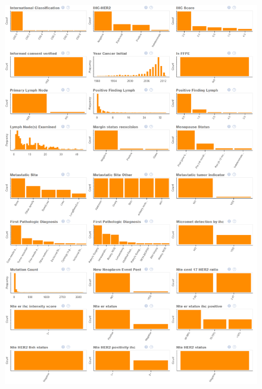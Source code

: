 \begin{figure}
	\centering
	\includegraphics[width=1
	\linewidth]{NOTEBOOK/IMAGES_EDA/3}
\end{figure}

